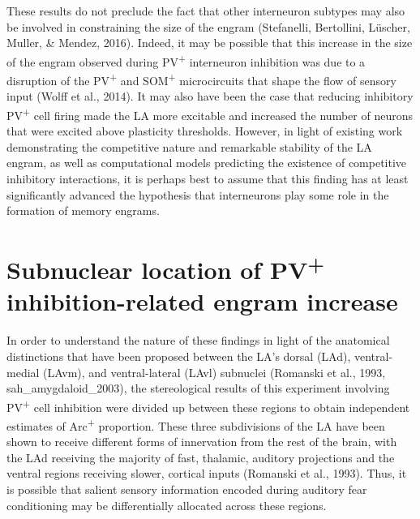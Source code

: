 \documentclass[12pt,a4paperpaper,]{report}
\begin{document}
These results do not preclude the fact that other interneuron subtypes
may also be involved in constraining the size of the engram (Stefanelli,
Bertollini, Lüscher, Muller, \& Mendez, 2016). Indeed, it may be
possible that this increase in the size of the engram observed during
PV\textsuperscript{+} interneuron inhibition was due to a disruption of
the PV\textsuperscript{+} and SOM\textsuperscript{+} microcircuits that
shape the flow of sensory input (Wolff et al., 2014). It may also have
been the case that reducing inhibitory PV\textsuperscript{+} cell firing
made the LA more excitable and increased the number of neurons that were
excited above plasticity thresholds. However, in light of existing work
demonstrating the competitive nature and remarkable stability of the LA
engram, as well as computational models predicting the existence of
competitive inhibitory interactions, it is perhaps best to assume that
this finding has at least significantly advanced the hypothesis that
interneurons play some role in the formation of memory engrams.

\section{\texorpdfstring{Subnuclear location of PV\textsuperscript{+}
inhibition-related engram
increase}{Subnuclear location of PV+ inhibition-related engram increase}}\label{subnuclear-location-of-pv-inhibition-related-engram-increase}

In order to understand the nature of these findings in light of the
anatomical distinctions that have been proposed between the LA's dorsal
(LAd), ventral-medial (LAvm), and ventral-lateral (LAvl) subnuclei
(Romanski et al., 1993, sah\_amygdaloid\_2003), the stereological
results of this experiment involving PV\textsuperscript{+} cell
inhibition were divided up between these regions to obtain independent
estimates of Arc\textsuperscript{+} proportion. These three subdivisions
of the LA have been shown to receive different forms of innervation from
the rest of the brain, with the LAd receiving the majority of fast,
thalamic, auditory projections and the ventral regions receiving slower,
cortical inputs (Romanski et al., 1993). Thus, it is possible that
salient sensory information encoded during auditory fear conditioning
may be differentially allocated across these regions.
\end{document}
